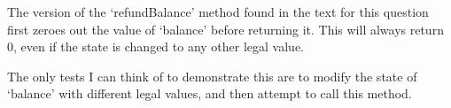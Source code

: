 The version of the `refundBalance' method found in the text for this
question first zeroes out the value of `balance' before returning it.
This will always return 0, even if the state is changed to any other
legal value.

The only tests I can think of to demonstrate this are to modify the
state of `balance' with different legal values, and then attempt to call
this method.
